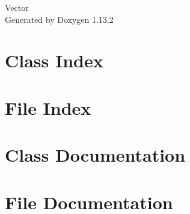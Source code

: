 \documentclass[twoside]{book}
\newcommand{\+}{\discretionary{\mbox{\scriptsize$\hookleftarrow$}}{}{}}
\newcommand{\clearemptydoublepage}{%
    \newpage{\pagestyle{empty}\cleardoublepage}%
  }
\begin{document}
  \raggedbottom
    \hypersetup{pageanchor=false,
                bookmarksnumbered=true,
                pdfencoding=unicode
               }
  \begin{titlepage}
  \vspace*{7cm}
  \begin{center}%
  {\Large Vector}\\
  \vspace*{1cm}
  {\large Generated by Doxygen 1.13.2}\\
  \end{center}
  \end{titlepage}
  \clearemptydoublepage
  \tableofcontents
  \clearemptydoublepage
  \hypersetup{pageanchor=true}
\chapter{Class Index}

\chapter{File Index}

\chapter{Class Documentation}

\chapter{File Documentation}

  \backmatter
  \newpage
  \clearemptydoublepage
  \printindex
\end{document}
